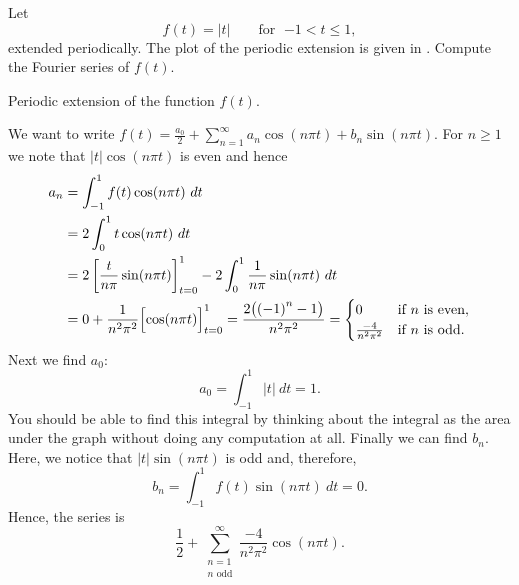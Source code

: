 \begin{example}
Let
\begin{equation*}
f(t) =
\lvert t \rvert
\qquad \text{for } \; {-1} < t \leq 1,
\end{equation*}
extended periodically.  The plot of the
periodic extension is given in .
Compute the Fourier series of $f(t)$.

\begin{myfig}
\capstart
{}
\caption{Periodic extension of the function $f(t)$.\label{gfs:sawcontfig}}
\end{myfig}

We want to
write $f(t) = \frac{a_0}{2} + \sum_{n=1}^\infty a_n \cos (n \pi t) + b_n
\sin (n \pi t)$.  For $n \geq 1$ we note that $\lvert t \rvert \cos (n \pi t)$
is even and hence
\begin{equation*}
\begin{split}
a_n & = \int_{-1}^1 f(t) \cos (n \pi t) ~ dt \\
& = 2 \int_{0}^1 t \cos (n \pi t) ~ dt \\
 & = 2 \left[ \frac{t}{n \pi} \sin (n \pi t) \right]_{t=0}^1 -
2 \int_{0}^1 \frac{1}{n \pi} \sin (n \pi t) ~ dt \\
& =  0 + \frac{1}{n^2 \pi^2} \Bigl[ \cos (n \pi t) \Bigr]_{t=0}^1
 =  \frac{2 \bigl( {(-1)}^n -1 \bigr) }{n^2 \pi^2}
=
\begin{cases}
0 & \text{if } n \text{ is even} , \\
\frac{-4 }{n^2 \pi^2} & \text{if } n \text{ is odd}  .
\end{cases}
\end{split}
\end{equation*}
Next we find $a_0$:
\begin{equation*}
a_0 = \int_{-1}^1 \lvert t \rvert ~ dt 
=
1 .
\end{equation*}
You should be able to find this integral by thinking about the integral
as the area under the graph without doing any computation at all.
Finally we can find $b_n$.  Here, we notice that
$\lvert t \rvert \sin (n \pi t)$ is odd and, therefore,
\begin{equation*}
b_n = \int_{-1}^1 f(t) \sin (n \pi t) ~ dt = 0 .
\end{equation*}
Hence,
the series is 
\begin{equation*}
\frac{1}{2} + 
\sum_{\substack{n=1 \\ n \text{ odd}}}^\infty \frac{-4}{n^2 \pi^2} \cos (n \pi t) .
\end{equation*}


\end{example}
